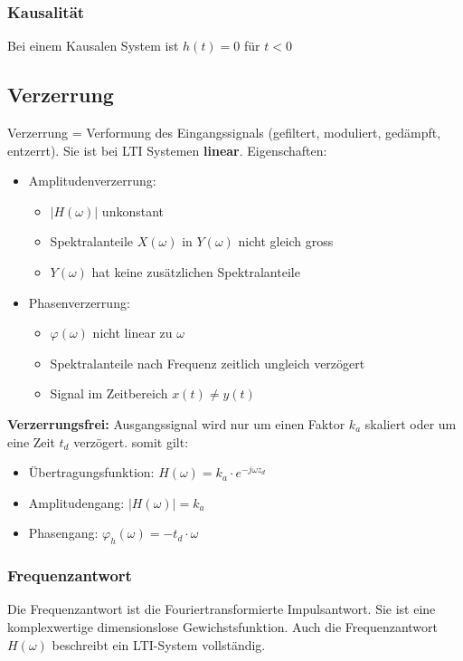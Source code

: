 \begin{multicols}{2}
    \subsubsection*{Kausalität}
    Bei einem Kausalen System ist $h(t) = 0$ für $t<0$

    \subsection*{Verzerrung}
    Verzerrung = Verformung des Eingangssignals (gefiltert, moduliert, gedämpft, entzerrt).
    Sie ist bei LTI Systemen \textbf{linear}.
    Eigenschaften:
    \begin{itemize}
        \item Amplitudenverzerrung:
              \begin{itemize}
                  \item $|H(\omega)|$ unkonstant
                  \item Spektralanteile $X(\omega)$ in $Y(\omega)$ nicht gleich gross
                  \item $Y(\omega)$ hat keine zusätzlichen Spektralanteile
              \end{itemize}
        \item Phasenverzerrung:
              \begin{itemize}
                  \item $\varphi(\omega)$ nicht linear zu $\omega$
                  \item Spektralanteile nach Frequenz zeitlich ungleich verzögert
                  \item Signal im Zeitbereich $x(t) \neq y(t)$
              \end{itemize}
    \end{itemize}
    \textbf{Verzerrungsfrei:} Ausgangssignal wird nur um einen Faktor $k_a$ skaliert
    oder um eine Zeit $t_d$ verzögert. somit gilt:
    \begin{itemize}
        \item Übertragungsfunktion: $H(\omega) = k_a \cdot e^{-j\omega z_d}$
        \item   Amplitudengang: $|H(\omega)| = k_a$
        \item  Phasengang: $\varphi_h(\omega) = -t_d \cdot \omega$
    \end{itemize}

    \subsubsection{Frequenzantwort}
    Die Frequenzantwort ist die Fouriertransformierte Impulsantwort.
    Sie ist eine komplexwertige dimensionslose Gewichstsfunktion.
    Auch die Frequenzantwort $H(\omega)$ beschreibt ein LTI-System vollständig.




\end{multicols}
